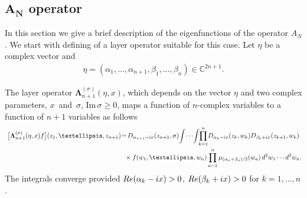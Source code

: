 \documentclass[11pt]{article}
\numberwithin{equation}{section}
\numberwithin{equation}{section}
\begin{document}
\subsection[AN operator]{$\boldsymbol{A_N}$ operator}%

In this section we give a brief description of the eigenfunctions of the operator $A_N$. We start with defining of a layer operator
suitable for this case. Let $\eta$ be a complex vector and
\begin{gather}\label{gamma-A}
\eta=(\alpha_1,\dots,\alpha_{n+1},\beta_{1},\dots,\beta_n) \in \mathbb C^{2n+1} .
\end{gather}
{\samepage
The layer operator $\boldsymbol \Lambda_{n+1}^{(\sigma)}(\eta,x)$, which depends on the vector $\eta$ and two complex parameters, $x$~and~$\sigma$, $\textrm{Im}\,\sigma\geq 0$, maps a function of $n$-complex variables to a function of $n+1$ variables as follows
\begin{gather}
\big[\boldsymbol\Lambda^{(\sigma)}_{n+1}(\eta,x) f\big](z_1,\dots,z_{n+1}) \!=\!D_{\alpha_{n+1}-{\rm i}x}(z_{n+1},\sigma)\!\int\! \cdots\!\int\!\!
\prod_{k=1}^{n}\! D_{\alpha_k-{\rm i}x}(z_k,w_k) D_{\beta_{k}+{\rm i}x}(z_{k+1},w_k)\notag
\\ \hphantom{\big[\boldsymbol\Lambda^{(\sigma)}_{n+1}(\eta,x) f\big](z_1,\dots,z_{n+1}) \!=}
{}\times f(w_1,\dots,w_{n}) \prod_{a=1}^n
\mu_{{(\alpha_a+\beta_{a})}/2}(w_a)
\, {\rm d}^2w_1\cdots {\rm d}^2w_n.\label{Lambda-A}
\end{gather}
The integrals converge provided $\mathop{\rm Re}(\alpha_k-{\rm i}x)>0$,
$\mathop{\rm Re}(\beta_{k}+{\rm i}x)>0$ for $k=1,\dots,n$.

}
\end{document}

